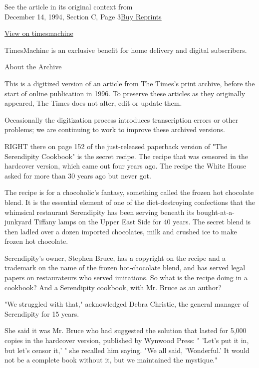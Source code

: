 See the article in its original context from\\
December 14, 1994, Section C, Page
3\href{https://store.nytimes.com/collections/new-york-times-page-reprints?utm_source=nytimes\&utm_medium=article-page\&utm_campaign=reprints}{Buy
Reprints}

\href{http://timesmachine.nytimes.com/timesmachine/1994/12/14/105880.html}{View
on timesmachine}

TimesMachine is an exclusive benefit for home delivery and digital
subscribers.

About the Archive

This is a digitized version of an article from The Times's print
archive, before the start of online publication in 1996. To preserve
these articles as they originally appeared, The Times does not alter,
edit or update them.

Occasionally the digitization process introduces transcription errors or
other problems; we are continuing to work to improve these archived
versions.

RIGHT there on page 152 of the just-released paperback version of "The
Serendipity Cookbook" is the secret recipe. The recipe that was censored
in the hardcover version, which came out four years ago. The recipe the
White House asked for more than 30 years ago but never got.

The recipe is for a chocoholic's fantasy, something called the frozen
hot chocolate blend. It is the essential element of one of the
diet-destroying confections that the whimsical restaurant Serendipity
has been serving beneath its bought-at-a-junkyard Tiffany lamps on the
Upper East Side for 40 years. The secret blend is then ladled over a
dozen imported chocolates, milk and crushed ice to make frozen hot
chocolate.

Serendipity's owner, Stephen Bruce, has a copyright on the recipe and a
trademark on the name of the frozen hot-chocolate blend, and has served
legal papers on restaurateurs who served imitations. So what is the
recipe doing in a cookbook? And a Serendipity cookbook, with Mr. Bruce
as an author?

"We struggled with that," acknowledged Debra Christie, the general
manager of Serendipity for 15 years.

She said it was Mr. Bruce who had suggested the solution that lasted for
5,000 copies in the hardcover version, published by Wynwood Press: "
'Let's put it in, but let's censor it,' " she recalled him saying. "We
all said, 'Wonderful.' It would not be a complete book without it, but
we maintained the mystique."

